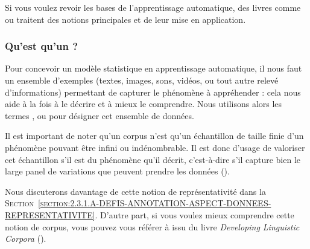 			\begin{leftBarInformation}
				Si vous voulez revoir les bases de l'apprentissage automatique, des livres comme \cite{zhou:2021:machine-learning} ou \cite{raschka-mirjalili:2019:python-machine-learning} traitent des notions principales et de leur mise en application.
			\end{leftBarInformation}
			
		\subsubsection{Qu'est qu'un \textguillemets{\texttt{corpus d'entraînement}} ?}
		\label{section:2.1.1.B-PRESENTATION-ANNOTATION-DEFINITION-BASE-APPRENTISSAGE}

			Pour concevoir un modèle statistique en apprentissage automatique, il nous faut un ensemble d'exemples (textes, images, sons, vidéos, ou tout autre relevé d'informations) permettant de capturer le phénomène à appréhender : cela nous aide à la fois à le décrire et à mieux le comprendre.
			Nous utilisons alors les termes ,  ou  pour désigner cet ensemble de données.
			
			Il est important de noter qu'un corpus n'est qu'un échantillon de taille finie d'un phénomène pouvant être infini ou indénombrable.
			Il est donc d'usage de valoriser cet échantillon s'il est  du phénomène qu'il décrit, c'est-à-dire s'il capture bien le large panel de variations que peuvent prendre les données (\cite{biber:1993:representativeness-corpus-design}).
			
			\begin{leftBarInformation}
				Nous discuterons davantage de cette notion de représentativité dans la \textsc{Section~\ref{section:2.3.1.A-DEFIS-ANNOTATION-ASPECT-DONNEES-REPRESENTATIVITE}}.
				D'autre part, si vous voulez mieux comprendre cette notion de corpus, vous pouvez vous référer à \cite{sinclair:2004:corpus-text-basic} issu du livre \textit{Developing Linguistic Corpora} (\cite{wynne:2004:developing-linguistic-corpora}).
			\end{leftBarInformation}
		
